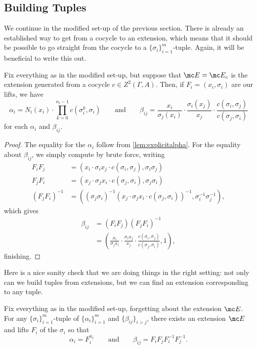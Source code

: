 \documentclass{article}
\numberwithin{equation}{section}
\begin{document}
\subsection{Building Tuples}
We continue in the modified set-up of the previous section. There is already an established way to get from a cocycle to an extension, which means that it should be possible to go straight from the cocycle to a $\{\sigma_i\}_{i=1}^m$-tuple. Again, it will be beneficial to write this out.
\begin{lemma} \label{lem:explicitalphabeta}
	Fix everything as in the modified set-up, but suppose that $\mc E=\mc E_c$ is the extension generated from a cocycle $c\in Z^2(\Gamma,A)$. Then, if $F_i=(x_i,\sigma_i)$ are our lifts, we have
	\[\alpha_i=N_i(x_i)\cdot\prod_{k=0}^{n_i-1}c\left(\sigma_i^k,\sigma_i\right)\qquad\text{and}\qquad\beta_{ij}=\frac{x_i}{\sigma_j(x_i)}\cdot\frac{\sigma_i(x_j)}{x_j}\cdot\frac{c(\sigma_i,\sigma_j)}{c(\sigma_j,\sigma_i)}\]
	for each $\alpha_i$ and $\beta_{ij}$.
\end{lemma}
\begin{proof}
	The equality for the $\alpha_i$ follow from \autoref{lem:explicitalpha}. For the equality about $\beta_{ij}$, we simply compute
	by brute force, writing
    \begin{align*}
        F_iF_j &= (x_i\cdot\sigma_ix_j\cdot c(\sigma_i,\sigma_j),\sigma_i\sigma_j) \\
        F_jF_i &= (x_j\cdot\sigma_jx_i\cdot c(\sigma_j,\sigma_i),\sigma_j\sigma_i) \\
        (F_jF_i)^{-1} &= \left((\sigma_j\sigma_i)^{-1}(x_j\cdot\sigma_jx_i\cdot c(\sigma_j,\sigma_i))^{-1},\sigma_i^{-1}\sigma_j^{-1}\right),
    \end{align*}
    which gives
    \begin{align*}
        \beta_{ij} &= (F_iF_j)(F_jF_i)^{-1} \\
        &= \left(\frac{x_i}{\sigma_jx_i}\cdot\frac{\sigma_ix_j}{x_j}\cdot\frac{c(\sigma_i,\sigma_j)}{c(\sigma_j,\sigma_i)},1\right),
    \end{align*}
	finishing.
\end{proof}
Here is a nice sanity check that we are doing things in the right setting: not only can we build tuples from extensions, but we can find an extension corresponding to any tuple.
\begin{cor} \label{cor:alltuplesfromextens}
	Fix everything as in the modified set-up, forgetting about the extension $\mc E$. For any $\{\sigma_i\}_{i=1}^m$-tuple of $\{\alpha_i\}_{i=1}^m$ and $\{\beta_{ij}\}_{i>j}$, there exists an extension $\mc E$ and lifts $F_i$ of the $\sigma_i$ so that
	\[\alpha_i=F_i^{n_i}\qquad\text{and}\qquad\beta_{ij}=F_iF_jF_i^{-1}F_j^{-1}.\]
\end{cor}
\end{document}
